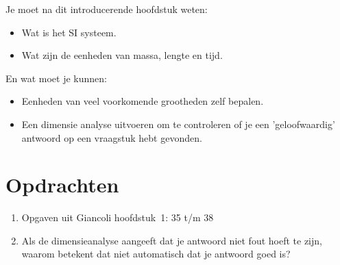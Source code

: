 Je moet na dit introducerende hoofdstuk weten:
\begin{itemize}
\item Wat is het SI systeem.
\item Wat zijn de eenheden van massa, lengte en tijd.
\end{itemize}
En wat moet je kunnen:
\begin{itemize}
\item Eenheden van veel voorkomende grootheden zelf bepalen.
\item Een dimensie analyse uitvoeren om te controleren of je een 'geloofwaardig' antwoord
op een vraagstuk hebt gevonden. 
\end{itemize}

\section{Opdrachten}

\begin{enumerate}
\item Opgaven uit Giancoli hoofdstuk~1: 35 t/m 38
\item Als de dimensieanalyse aangeeft dat je antwoord niet fout hoeft te zijn, waarom betekent
dat niet automatisch dat je antwoord goed is?
\end{enumerate}

